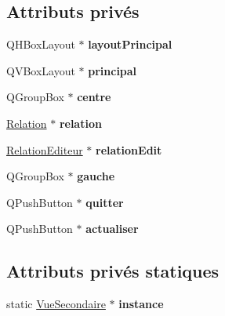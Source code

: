 \subsection*{Attributs privés}
\begin{DoxyCompactItemize}
\item 
\hypertarget{class_vue_secondaire_ae67763136ea85968932d26f3c2363e23}{Q\-H\-Box\-Layout $\ast$ {\bfseries layout\-Principal}}\label{class_vue_secondaire_ae67763136ea85968932d26f3c2363e23}

\item 
\hypertarget{class_vue_secondaire_a2e69be7e1a13dc9918e7611ba2ef9394}{Q\-V\-Box\-Layout $\ast$ {\bfseries principal}}\label{class_vue_secondaire_a2e69be7e1a13dc9918e7611ba2ef9394}

\item 
\hypertarget{class_vue_secondaire_a0f151bf36e1bb0c9915eb90b82fb00d5}{Q\-Group\-Box $\ast$ {\bfseries centre}}\label{class_vue_secondaire_a0f151bf36e1bb0c9915eb90b82fb00d5}

\item 
\hypertarget{class_vue_secondaire_a3bcb066271a0b3183f9c34736fbe0f0c}{\hyperlink{class_relation}{Relation} $\ast$ {\bfseries relation}}\label{class_vue_secondaire_a3bcb066271a0b3183f9c34736fbe0f0c}

\item 
\hypertarget{class_vue_secondaire_a789d5ea9121cda385d58070fa34e4dc8}{\hyperlink{class_relation_editeur}{Relation\-Editeur} $\ast$ {\bfseries relation\-Edit}}\label{class_vue_secondaire_a789d5ea9121cda385d58070fa34e4dc8}

\item 
\hypertarget{class_vue_secondaire_af97140ff4a8a511ddb0e7e285666618d}{Q\-Group\-Box $\ast$ {\bfseries gauche}}\label{class_vue_secondaire_af97140ff4a8a511ddb0e7e285666618d}

\item 
\hypertarget{class_vue_secondaire_a79901bbe5834dee7a8014f10eb70d6c7}{Q\-Push\-Button $\ast$ {\bfseries quitter}}\label{class_vue_secondaire_a79901bbe5834dee7a8014f10eb70d6c7}

\item 
\hypertarget{class_vue_secondaire_a6a5663f223ae025eae5bef144e26ad0b}{Q\-Push\-Button $\ast$ {\bfseries actualiser}}\label{class_vue_secondaire_a6a5663f223ae025eae5bef144e26ad0b}

\end{DoxyCompactItemize}
\subsection*{Attributs privés statiques}
\begin{DoxyCompactItemize}
\item 
\hypertarget{class_vue_secondaire_a5cbd56d7df3b44772b5196f76788b215}{static \hyperlink{class_vue_secondaire}{Vue\-Secondaire} $\ast$ {\bfseries instance}}\label{class_vue_secondaire_a5cbd56d7df3b44772b5196f76788b215}

\end{DoxyCompactItemize}


